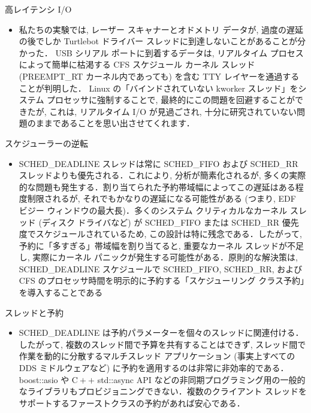 \begin{frame}{高レイテンシ I/O}
    \begin{itemize}
        \item 私たちの実験では, レーザー スキャナーとオドメトリ データが, 過度の遅延の後でしか Turtlebot ドライバー スレッドに到達しないことがあることが分かった． USB シリアル ポートに到着するデータは, リアルタイム プロセスによって簡単に枯渇する CFS スケジュール カーネル スレッド (PREEMPT\_RT カーネル内であっても) を含む TTY レイヤーを通過することが判明した． Linux の「バインドされていない kworker スレッド」をシステム プロセッサに強制することで, 最終的にこの問題を回避することができたが, これは, リアルタイム I/O が見過ごされ, 十分に研究されていない問題のままであることを思い出させてくれます．
    \end{itemize}
\end{frame}

\begin{frame}{スケジューラーの逆転}
    \begin{itemize}
        \item SCHED\_DEADLINE スレッドは常に SCHED\_FIFO および SCHED\_RR スレッドよりも優先される．これにより, 分析が簡素化されるが, 多くの実際的な問題も発生する．割り当てられた予約帯域幅によってこの遅延はある程度制限されるが, それでもかなりの遅延になる可能性がある (つまり, EDF ビジー ウィンドウの最大長)．多くのシステム クリティカルなカーネル スレッド (ディスク ドライバなど) が SCHED\_FIFO または SCHED\_RR 優先度でスケジュールされているため, この設計は特に残念である．したがって, 予約に「多すぎる」帯域幅を割り当てると, 重要なカーネル スレッドが不足し, 実際にカーネル パニックが発生する可能性がある．原則的な解決策は, SCHED\_DEADLINE スケジュールで SCHED\_FIFO, SCHED\_RR, および CFS のプロセッサ時間を明示的に予約する「スケジューリング クラス予約」を導入することである
    \end{itemize}
\end{frame}

\begin{frame}{スレッドと予約}
    \begin{itemize}
        \item SCHED\_DEADLINE は予約パラメーターを個々のスレッドに関連付ける．したがって, 複数のスレッド間で予算を共有することはできず, スレッド間で作業を動的に分散するマルチスレッド アプリケーション (事実上すべての DDS ミドルウェアなど) に予約を適用するのは非常に非効率的である． boost::asio や $\mathrm{C}++$ std::async API などの非同期プログラミング用の一般的なライブラリもプロビジョニングできない．複数のクライアント スレッドをサポートするファーストクラスの予約があれば安心である．
    \end{itemize}
\end{frame}

